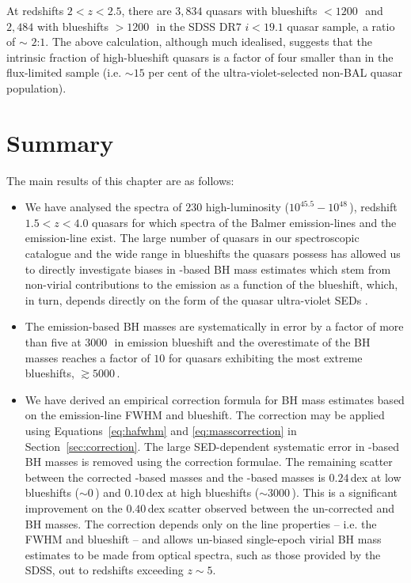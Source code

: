 At redshifts $2 < z <2.5$, there are $3,834$ quasars with  blueshifts $<1200$\,\kms\, and $2,484$ with blueshifts $>1200$\,\kms\, in the SDSS DR$7$ $i < 19.1$ quasar sample, a ratio of $\sim$ $2$:$1$. 
The above calculation, although much idealised, suggests that the intrinsic fraction of high-blueshift quasars is a factor of four smaller than in the flux-limited sample (i.e. $\sim15$ per cent of the ultra-violet-selected non-BAL quasar population). 

\section{Summary}
\label{sec:conclusions}

The main results of this chapter are as follows: 

\begin{itemize}

\item We have analysed the spectra of $230$ high-luminosity ($10^{45.5}-10^{48}$\,\ergs), redshift $1.5 < z < 4.0$ quasars for which spectra of the Balmer emission-lines and the  emission-line exist.
The large number of quasars in our spectroscopic catalogue and the wide range in  blueshifts the quasars possess has allowed us to directly investigate biases in -based BH mass estimates which stem from non-virial contributions to the  emission as a function of the  blueshift, which, in turn, depends directly on the form of the quasar ultra-violet SEDs \citep{richards11}.

\item The  emission-based BH masses are systematically in error by a factor of more than five at $3000$\,\kms\, in  emission blueshift and the overestimate of the BH masses reaches a factor of $10$ for quasars exhibiting the most extreme blueshifts, $\gtrsim5000$\,\kms. 

\item We have derived an empirical correction formula for BH mass estimates based on the  emission-line FWHM and blueshift.
The correction may be applied using Equations~\ref{eq:hafwhm} and \ref{eq:masscorrection} in Section~\ref{sec:correction}.
The large SED-dependent systematic error in -based BH masses is removed using the correction formulae.
The remaining scatter between the corrected -based masses and the \hans-based masses is $0.24$\,dex at low  blueshifts ($\sim0$\,\kms) and $0.10$\,dex at high blueshifts ($\sim3000$\,\kms). 
This is a significant improvement on the $0.40$\,dex scatter observed between the un-corrected  and \ha BH masses. 
The correction depends only on the  line properties -- i.e. the FWHM and blueshift -- and allows un-biased single-epoch virial BH mass estimates to be made from optical spectra, such as those provided by the SDSS, out to redshifts exceeding $z\sim 5$. 

\end{itemize}

